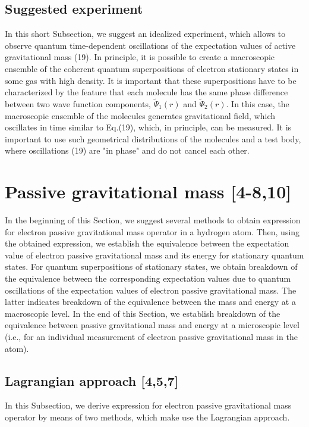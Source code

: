 \documentclass{ws-ijmpd}
\begin{document}
\subsection{Suggested experiment}
In this short Subsection, we suggest an idealized experiment,
which allows to observe quantum time-dependent oscillations of
the expectation values of active gravitational mass (19). In
principle, it is possible to create a macroscopic ensemble of the
coherent quantum superpositions of electron stationary states in
some gas with high density. It is important that these
superpositions have to be characterized by the feature that each
molecule has the same phase difference between two wave function
components, $\tilde \Psi_1(r)$ and $\tilde \Psi_2(r)$. In this
case, the macroscopic ensemble of the molecules generates
gravitational field, which oscillates in time similar to Eq.(19),
which, in principle, can be measured. It is important to use such
geometrical distributions of the molecules and a test body, where oscillations (19) are "in phase" and do not cancel each other.

\section{Passive gravitational mass [4-8,10]}
In the beginning of this Section, we suggest several methods to
obtain expression for electron passive gravitational mass operator
in a hydrogen atom. Then, using the obtained expression, we
establish the equivalence between the expectation value of
electron passive gravitational mass and its energy for stationary
quantum states. For quantum superpositions of stationary states,
we obtain breakdown of the equivalence between the corresponding
expectation values due to quantum oscillations of the expectation
values of electron passive gravitational mass. The latter indicates
breakdown of the equivalence between the mass and energy at a
macroscopic level. In the end of this Section, we establish
breakdown of the equivalence between passive gravitational mass
and energy at a microscopic level (i.e., for an individual
measurement of electron passive gravitational mass in the atom).

\subsection{Lagrangian approach [4,5,7]}
In this Subsection, we derive expression for electron passive
gravitational mass operator by means of two methods, which make
use the Lagrangian approach.
\end{document}
